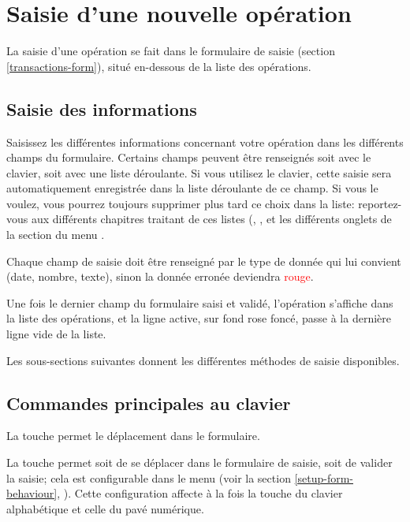 \section{Saisie d'une nouvelle opération\label{transactions-new}}

La saisie d'une opération se fait dans le formulaire de saisie (section \vref{transactions-form}), situé en-dessous de la liste des opérations.


\subsection{Saisie des informations\label{transactions-new-entry}}

Saisissez les différentes informations concernant votre opération dans les différents champs du formulaire. Certains champs peuvent être renseignés soit avec le clavier, soit avec une liste déroulante. Si vous utilisez le clavier, cette saisie sera automatiquement enregistrée dans la liste déroulante de ce champ. Si vous le voulez, vous pourrez toujours supprimer plus tard ce choix dans la liste: reportez-vous aux différents chapitres traitant de ces listes (, ,  et les différents onglets de la section  du menu .

Chaque champ de saisie doit être renseigné par le type de donnée qui lui convient (date, nombre, texte), sinon la donnée erronée deviendra \textcolor{red}{rouge}.

Une fois le dernier champ du formulaire saisi et validé, l'opération s'affiche dans la liste des opérations, et la ligne active, sur \colorbox[RGB]{245,155,155}{fond rose foncé}, passe à la dernière ligne vide de la liste.

Les sous-sections suivantes donnent les différentes méthodes de saisie disponibles.


\subsection{Commandes principales au clavier\label{transactions-new-keyboard}}

La touche  permet le déplacement dans le formulaire.

La touche  permet soit de se déplacer dans le formulaire de saisie, soit de valider la saisie; cela est configurable dans le menu  (voir la section \vref{setup-form-behaviour}, ). Cette configuration affecte à la fois la touche  du clavier alphabétique et celle du pavé numérique.

